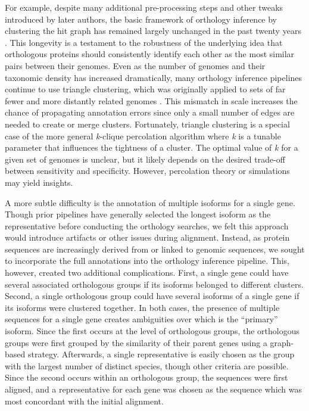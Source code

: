 \documentclass[10pt,letterpaper]{article}
\begin{document}
For example, despite many additional pre-processing steps and other tweaks introduced by later authors, the basic framework of orthology inference by clustering the hit graph has remained largely unchanged in the past twenty years \cite{Remm2001, Li2003, Jensen2007, Linard2011, Emms2015, Train2017, Cosentino2018}. This longevity is a testament to the robustness of the underlying idea that orthologous proteins should consistently identify each other as the most similar pairs between their genomes. Even as the number of genomes and their taxonomic density has increased dramatically, many orthology inference pipelines continue to use triangle clustering, which was originally applied to sets of far fewer and more distantly related genomes \cite{Tatusov1997}. This mismatch in scale increases the chance of propagating annotation errors since only a small number of edges are needed to create or merge clusters. Fortunately, triangle clustering is a special case of the more general \textit{k}-clique percolation algorithm where \textit{k} is a tunable parameter that influences the tightness of a cluster. The optimal value of \textit{k} for a given set of genomes is unclear, but it likely depends on the desired trade-off between sensitivity and specificity. However, percolation theory or simulations may yield insights.

A more subtle difficulty is the annotation of multiple isoforms for a single gene. Though prior pipelines have generally selected the longest isoform as the representative before conducting the orthology searches, we felt this approach would introduce artifacts or other issues during alignment. Instead, as protein sequences are increasingly derived from or linked to genomic sequences, we sought to incorporate the full annotations into the orthology inference pipeline. This, however, created two additional complications. First, a single gene could have several associated orthologous groups if its isoforms belonged to different clusters. Second, a single orthologous group could have several isoforms of a single gene if its isoforms were clustered together. In both cases, the presence of multiple sequences for a single gene creates ambiguities over which is the “primary” isoform. Since the first occurs at the level of orthologous groups, the orthologous groups were first grouped by the similarity of their parent genes using a graph-based strategy. Afterwards, a single representative is easily chosen as the group with the largest number of distinct species, though other criteria are possible. Since the second occurs within an orthologous group, the sequences were first aligned, and a representative for each gene was chosen as the sequence which was most concordant with the initial alignment.
\end{document}
